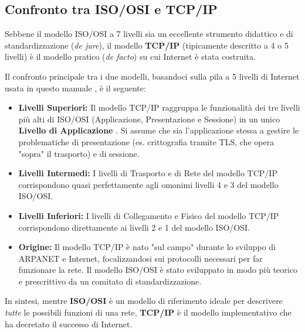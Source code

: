 \subsection{Confronto tra ISO/OSI e TCP/IP}

Sebbene il modello ISO/OSI a 7 livelli sia un eccellente strumento didattico e di standardizzazione (\textit{de jure}), il modello \textbf{TCP/IP} (tipicamente descritto a 4 o 5 livelli) è il modello pratico (\textit{de facto}) su cui Internet è stata costruita.

Il confronto principale tra i due modelli, basandoci sulla pila a 5 livelli di Internet usata in questo manuale , è il seguente:

\begin{itemize}
    \item \textbf{Livelli Superiori:} Il modello TCP/IP raggruppa le funzionalità dei tre livelli più alti di ISO/OSI (Applicazione, Presentazione e Sessione) in un unico \textbf{Livello di Applicazione} . Si assume che sia l'applicazione stessa a gestire le problematiche di presentazione (es. crittografia tramite TLS, che opera "sopra" il trasporto) e di sessione.

    \item \textbf{Livelli Intermedi:} I livelli di Trasporto e di Rete del modello TCP/IP corrispondono quasi perfettamente agli omonimi livelli 4 e 3 del modello ISO/OSI.

    \item \textbf{Livelli Inferiori:} I livelli di Collegamento e Fisico del modello TCP/IP corrispondono direttamente ai livelli 2 e 1 del modello ISO/OSI.

    \item \textbf{Origine:} Il modello TCP/IP è nato "sul campo" durante lo sviluppo di ARPANET e Internet, focalizzandosi sui protocolli necessari per far funzionare la rete. Il modello ISO/OSI è stato sviluppato in modo più teorico e prescrittivo da un comitato di standardizzazione.
\end{itemize}

In sintesi, mentre \textbf{ISO/OSI} è un modello di riferimento ideale per descrivere \textit{tutte} le possibili funzioni di una rete, \textbf{TCP/IP} è il modello implementativo che ha decretato il successo di Internet.
